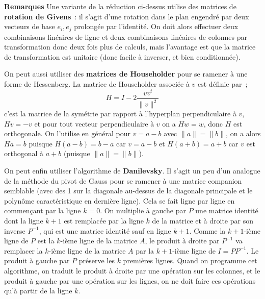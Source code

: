 \documentclass[a4paper,11pt]{book}
\begin{document}
\begin{giacjshere}
{\bf Remarques}
Une variante de la r\'eduction ci-dessus utilise des matrices de
{\bf rotation de Givens}~: il s'agit d'une rotation
dans le plan engendr\'e par deux vecteurs de base $e_i,e_j$ 
prolong\'ee par l'identit\'e. On doit alors effectuer 
deux combinaisons lin\'eaires de ligne
et deux combinaisons lin\'eaires de colonnes par transformation
donc deux fois plus de calculs, mais l'avantage est que la matrice
de transformation est unitaire (donc facile \`a inverser, et bien
conditionn\'ee).

On peut aussi utiliser des {\bf matrices de
Householder} 
pour  se ramener \`a une forme de Hessenberg.
La matrice de Householder associ\'ee \`a $v$ est d\'efinie par~;
$$H=I-2\frac{v v^t}{\|v\|^2}$$
c'est la matrice de la sym\'etrie par rapport \`a l'hyperplan 
perpendiculaire \`a $v$, $Hv=-v$ et pour tout vecteur
perpendiculaire \`a $v$ on a $Hw=w$, donc $H$ est orthogonale.
On l'utilise en g\'en\'eral pour $v=a-b$ avec $\|a\|=\|b\|$,
on a alors $Ha=b$ puisque $H(a-b)=b-a$ car $v=a-b$ et $H(a+b)=a+b$
car $v$ est orthogonal \`a $a+b$ (puisque $\|a\|=\|b\|$).

On peut enfin utiliser l'algorithme de {\bf Danilevsky}. 
Il s'agit un peu
d'un analogue de la m\'ethode du pivot de Gauss pour se ramener
\`a une matrice companion semblable (avec des 1 sur
la diagonale au-dessus de la diagonale
principale et le polyn\^ome caract\'eristique en derni\`ere
ligne). Cela se fait ligne par ligne en commen\c{c}ant par
la ligne $k=0$. On multiplie \`a gauche par $P$ une matrice identit\'e
dont la ligne $k+1$ est remplac\'ee par la ligne $k$ de la matrice
et \`a droite par son inverse $P^{-1}$, qui est une matrice identit\'e sauf
en ligne $k+1$. Comme la $k+1$-i\`eme ligne de $P$ est la $k$-i\`eme
ligne de la matrice $A$, le produit \`a droite par $P^{-1}$ va remplacer
la $k$-i\`eme ligne de la matrice $A$ par la $k+1$-i\`eme ligne de $I=PP^{-1}$.
Le produit \`a gauche par $P$ pr\'eserve les $k$ premi\`eres lignes.
Quand on programme cet algorithme, on traduit le produit \`a droite
par une op\'eration sur les colonnes, et le produit \`a gauche par
une op\'eration sur les lignes, on ne doit faire ces op\'erations qu'\`a 
partir de la ligne $k$.


\end{giacjshere}
\end{document}
